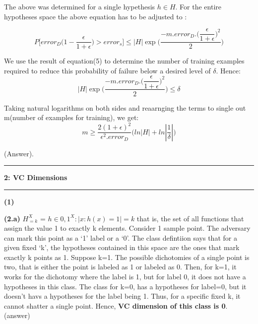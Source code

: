 \documentclass{article}
\newcommand\question[2]{\vspace{.25in}\hrule\textbf{#1: #2}\hrule\vspace{.10in}}
\renewcommand\part[1]{\vspace{.10in}\textbf{(#1)}}
\begin{document}
    The above was determined for a single hypethesis $h \in H$. For the entire hypotheses space the above equation has to be adjusted to :
    
    \begin{equation}
    P\bigg [  error_{D}\bigg (  1 - \dfrac{\epsilon}{1 + \epsilon}  \bigg ) > error_{s}  \bigg ] \leq |H|\exp \bigg (\dfrac{-m.error_{D}.\bigg (\dfrac{\epsilon}{1 + \epsilon}\bigg )^2}{2}\bigg )
    \end{equation}
    
    We use the result of equation(5) to determine the number of training examples required to reduce this probability of failure below a desired level of $\delta$. Hence: \newline
    \[ |H|\exp \bigg (\dfrac{-m.error_{D}.\bigg (\dfrac{\epsilon}{1 + \epsilon}\bigg )^2}{2}\bigg ) \leq \delta \]
    
    Taking natural logarithms on both sides and reaarnging the terms to single out m(number of examples for training), we get: \newline
    \begin{equation}
      m \geq \dfrac{2(1 + \epsilon)^2}{\epsilon^2 . error_{D}}\bigg (  ln|H| + ln|\dfrac{1}{\delta}| \bigg )
    \end{equation}
    
    (Answer).
  
  \question{2}{VC Dimensions}
  \part{1}
  
  \part{2.a} 
    $H_{=k}^X$ = ${h \in {0,1}^X : |{x:h(x)=1}| = k}$
    that is, the set of all functions that assign the value 1 to exactly k elements.
    Consider 1 sample point. The adversary can mark this point as a `1' label or a `0'. The class defintiion says that for a given fixed `k', the hypotheses contained in this space are the ones that mark exactly k points as 1. Suppose k=1. The possible dichotomies of a single point is two, that is either the point is labeled as 1 or labeled as 0. Then, for k=1, it works for the dichotomy where the label is 1, but for label 0, it does not have a hypotheses in this class. The class for k=0, has a hypotheses for label=0, but it doesn't havs a hypotheses for the label being 1. Thus, for a specific fixed k, it cannot shatter a single point. Hence, \textbf { VC dimension of this class is 0}. (answer) \newline
    
\end{document}
